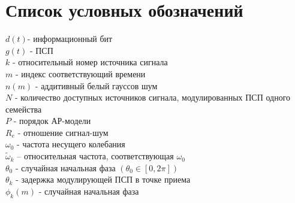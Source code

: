 \chapter*{Список условных обозначений}
\noindent
${d(t)}$- информационный бит \\
${g(t)}$ - ПСП 	\\
${k}$ - относительный номер источника сигнала	\\
${m}$ - индекс соответствующий времени	\\
${n(m)}$ - аддитивный белый гауссов шум \\
${N}$ - количество доступных источников сигнала, модулированных ПСП одного семейства \\
${P}$ - порядок АР-модели \\
${R_e}$ - отношение сигнал-шум \\

\noindent
${\omega_0}$ - частота несущего колебания \\
${\tilde{\omega}_{k}}$  – относительная частота, соответствующая ${\omega_0}$ \\
${\theta_0}$ - случайная начальная фаза ${(\theta_0 \in [0, 2\pi])}$ \\
${\theta_k}$ - задержка модулирующей ПСП в точке приема \\
${\phi_k(m)}$ - случайная начальная фаза \\

\newpage
